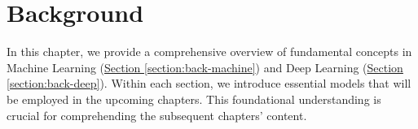 \chapter{Background}
\label{chapter:background}

\begin{ChapAbstract}
    In this chapter, we provide a comprehensive overview of fundamental concepts in Machine Learning (\hyperref[section:back-machine]{Section \ref{section:back-machine}}) and Deep Learning (\hyperref[section:back-deep]{Section \ref{section:back-deep}}). Within each section, we introduce essential models that will be employed in the upcoming chapters. This foundational understanding is crucial for comprehending the subsequent chapters' content.  
\end{ChapAbstract}


